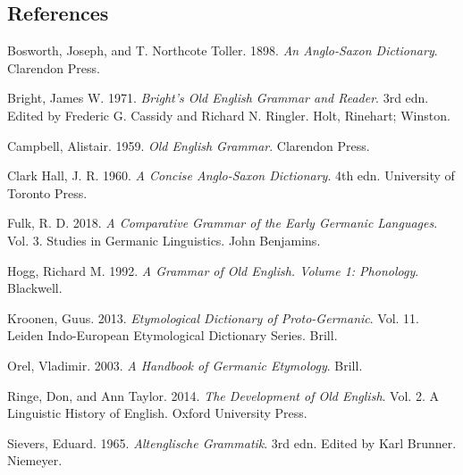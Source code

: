 \documentclass[
  british,
  a4paper,
]{article}
\newlength{\cslhangindent}
\newenvironment{CSLReferences}[2] %
 {\begin{list}{}{%
  \setlength{\itemindent}{0pt}
  \setlength{\leftmargin}{0pt}
  \setlength{\parsep}{0pt}
  \ifodd #1
   \setlength{\leftmargin}{\cslhangindent}
   \setlength{\itemindent}{-1\cslhangindent}
  \fi
  \setlength{\itemsep}{#2\baselineskip}}}
 {\end{list}}
\begin{document}
\clearpage

\subsection*{References}\label{references}

\protect{}\label{refs}
\begin{CSLReferences}{1}{1}
Bosworth, Joseph, and T. Northcote Toller. 1898. \emph{An {Anglo-Saxon}
Dictionary}. Clarendon Press.

Bright, James W. 1971. \emph{Bright's {Old English} Grammar and Reader}.
3rd edn. Edited by Frederic G. Cassidy and Richard N. Ringler. Holt,
Rinehart; Winston.

Campbell, Alistair. 1959. \emph{Old {English} Grammar}. Clarendon Press.

Clark Hall, J. R. 1960. \emph{A Concise {Anglo-Saxon} Dictionary}. 4th
edn. University of Toronto Press.

Fulk, R. D. 2018. \emph{A Comparative Grammar of the Early {Germanic}
Languages}. Vol. 3. Studies in Germanic Linguistics. John Benjamins.

Hogg, Richard M. 1992. \emph{A Grammar of Old English. Volume 1:
Phonology}. Blackwell.

Kroonen, Guus. 2013. \emph{Etymological Dictionary of {Proto-Germanic}}.
Vol. 11. Leiden Indo-European Etymological Dictionary Series. Brill.

Orel, Vladimir. 2003. \emph{A Handbook of {Germanic} Etymology}. Brill.

Ringe, Don, and Ann Taylor. 2014. \emph{The Development of {Old
English}}. Vol. 2. A Linguistic History of English. Oxford University
Press.

Sievers, Eduard. 1965. \emph{Altenglische Grammatik}. 3rd edn. Edited by
Karl Brunner. Niemeyer.

\end{CSLReferences}
\end{document}
